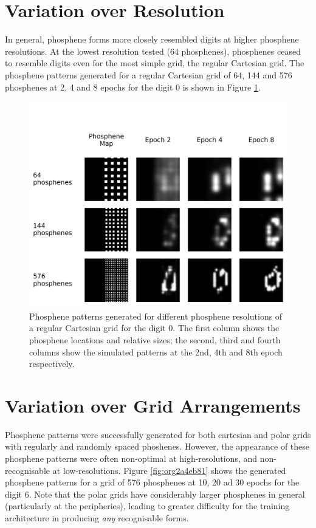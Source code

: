 \documentclass[a4paper,11pt,openany]{book}
\begin{document}
\section*{Variation over Resolution}
\label{sec:orgc6ded03}

In general, phosphene forms more closely resembled digits at higher phosphene resolutions.
At the lowest resolution tested (64 phosphenes), phosphenes ceased to resemble digits even for the most simple grid, the regular Cartesian grid.
The phosphene patterns generated for a regular Cartesian grid of 64, 144 and 576 phosphenes at 2, 4 and 8 epochs for the digit 0 is shown in Figure \ref{fig:org31a71ad}.

\begin{figure}[htbp]
\centering
\includegraphics[width=.9\linewidth]{./images/results_different_resolution.png}
\caption{\label{fig:org31a71ad}
Phosphene patterns generated for different phosphene resolutions of a regular Cartesian grid for the digit 0. The first column shows the phosphene locations and relative sizes; the second, third and fourth columns show the simulated patterns at the 2nd, 4th and 8th epoch respectively.}
\end{figure}

\section*{Variation over Grid Arrangements}
\label{sec:org71521d7}

Phosphene patterns were successfully generated for both cartesian and polar grids with regularly and randomly spaced phoshenes.
However, the appearance of these phosphene patterns were often non-optimal at high-resolutions, and non-recognisable at low-resolutions.
Figure \ref{fig:org2a4eb81} shows the generated phosphene patterns for a grid of 576 phosphenes at 10, 20 ad 30 epochs for the digit 6.
Note that the polar grids have considerably larger phosphenes in general (particularly at the peripheries), leading to greater difficulty for the training architecture in producing \emph{any} recognisable forms.
\end{document}
